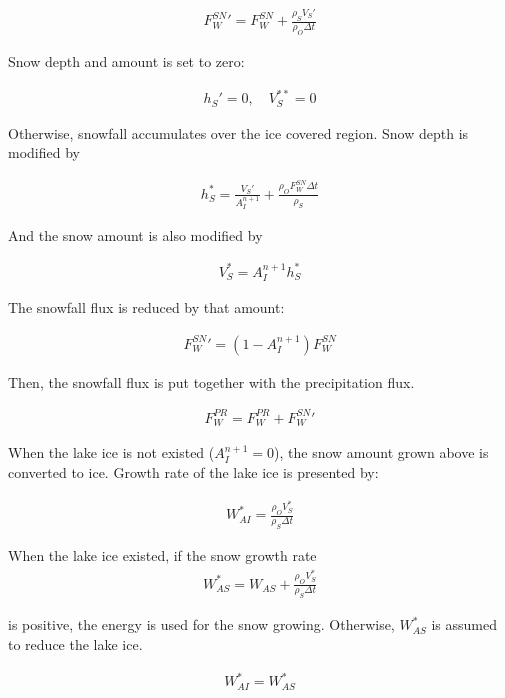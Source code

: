 \begin{eqnarray}
    {F_W^{SN}}' = F_W^{SN} + \frac{\rho_S V_S'}{\rho_O \Delta t}
\end{eqnarray}

Snow depth and amount is set to zero:

\begin{eqnarray}
    h_S'=0, \quad V_S^{**} = 0
\end{eqnarray}

Otherwise, snowfall accumulates over the ice covered region. Snow depth
is modified by

\begin{eqnarray}
    h_S^* = \frac{V_S'}{A_I^{n+1}} + \frac{\rho_O F_W^{SN}\Delta t}{\rho_S}
\end{eqnarray}

And the snow amount is also modified by

\begin{eqnarray}
    V_S^* = A_I^{n+1} h_S^*
\end{eqnarray}

The snowfall flux is reduced by that amount:

\begin{eqnarray}
    {F_W^{SN}}' = (1-A_I^{n+1}) F_W^{SN}
\end{eqnarray}

Then, the snowfall flux is put together with the precipitation flux.

\begin{eqnarray}
    F_W^{PR} = F_W^{PR} + {F_W^{SN}}'
\end{eqnarray}

When the lake ice is not existed (\(A_I^{n+1}=0\)), the snow amount
grown above is converted to ice. Growth rate of the lake ice is
presented by:

\begin{eqnarray}
 W_{AI}^* =   \frac{\rho_O V_S^{*}}{\rho_S \Delta t}
\end{eqnarray}

When the lake ice existed, if the snow growth rate \begin{eqnarray}
    W_{AS}^* = W_{AS} +  \frac{\rho_O V_S^{*}}{\rho_S \Delta t}
\end{eqnarray}

is positive, the energy is used for the snow growing. Otherwise,
\(W_{AS}^*\) is assumed to reduce the lake ice.

\begin{eqnarray}
    W_{AI}^* = W_{AS}^*
\end{eqnarray}

